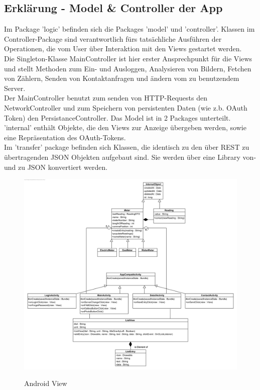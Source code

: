 \subsection*{Erklärung - Model \& Controller der App}
Im Package 'logic' befinden sich die Packages 'model' und 'controller'.
Klassen im Controller-Package sind verantwortlich fürs tatsächliche Ausführen der Operationen, die vom User über Interaktion mit den Views gestartet werden. \\ Die Singleton-Klasse MainController ist hier erster Ansprechpunkt für die Views und stellt Methoden zum Ein- und Ausloggen, Analysieren von Bildern, Fetchen von Zählern, Senden von Kontaktanfragen und ändern vom zu benutzendem Server. \\ Der MainController benutzt zum senden von HTTP-Requests den NetworkController und zum Speichern von persistenten Daten (wie z.b. OAuth Token) den PersistanceController.
Das Model ist in 2 Packages unterteilt. 'internal' enthält Objekte, die den Views zur Anzeige übergeben werden, sowie eine Repräsentation des OAuth-Tokens. \\ Im 'transfer' package befinden sich Klassen, die identisch zu den über REST zu übertragenden JSON Objekten aufgebaut sind. Sie werden über eine Library von- und zu JSON konvertiert werden.

\begin{figure}[H]
\hspace{-1cm}
\includegraphics[scale=0.95]{img/diagrams/Android-Class-Diagram-View}\\
\caption{Android View}
\end{figure}


